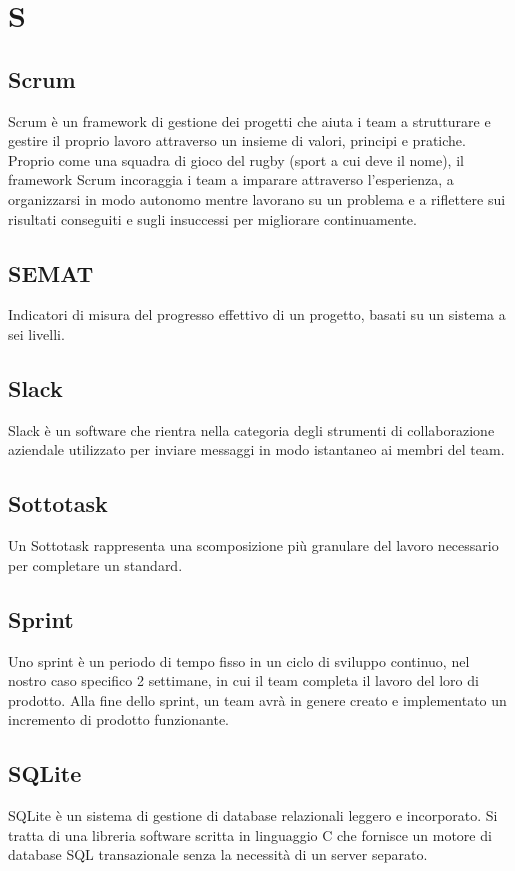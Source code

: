 \chapter{S}

\section{Scrum}
Scrum è un framework di gestione dei progetti  che aiuta i team a strutturare e gestire il proprio lavoro attraverso un insieme di valori, principi e pratiche. Proprio come una squadra di gioco del rugby (sport a cui deve il nome), il framework Scrum incoraggia i team a imparare attraverso l'esperienza, a organizzarsi in modo autonomo mentre lavorano su un problema e a riflettere sui risultati conseguiti e sugli insuccessi per migliorare continuamente.

\section{SEMAT}
Indicatori di misura del progresso effettivo di un progetto, basati su un sistema a sei livelli.

\section{Slack}
Slack è un software che rientra nella categoria degli strumenti di collaborazione aziendale utilizzato per inviare messaggi in modo istantaneo ai membri del team.

\section{Sottotask}
Un Sottotask rappresenta una scomposizione più granulare del lavoro necessario per completare un  standard.

\section{Sprint}
Uno sprint è un periodo di tempo fisso in un ciclo di sviluppo continuo, nel nostro caso specifico 2 settimane, in cui il team completa il lavoro del loro  di prodotto. Alla fine dello sprint, un team avrà in genere creato e implementato un incremento di prodotto funzionante.

\section{SQLite}\label{sec:SQLite3}
SQLite è un sistema di gestione di database relazionali leggero e incorporato. Si tratta di una libreria software scritta in linguaggio C che fornisce un motore di database SQL transazionale senza la necessità di un server separato.

